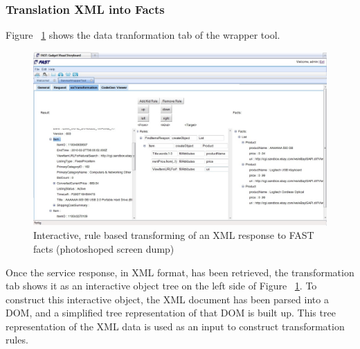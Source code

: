 \documentclass{fast_latex}
\begin{document}
\subsubsection{Translation XML into Facts} %
\label{ssub:translation_xml_into_facts}

Figure ~\ref{fig:response_service_execution} shows the data tranformation tab of the wrapper tool. 

\begin{figure}
  \begin{center}
      \includegraphics[angle=90,width=0.8\linewidth]{images/ServiceWrapperToolGVSWithTransformationRules.jpg}
    \caption{Interactive, rule based transforming of an XML response to FAST facts (photoshoped screen dump)}
    \label{fig:response_service_execution}
  \end{center}
\end{figure}

Once the service response, in XML format, has been retrieved, the transformation tab shows it as an interactive object tree on the left side of Figure ~\ref{fig:response_service_execution}. To construct this interactive object, the XML document has been parsed into a DOM, and a simplified tree representation of that DOM is built up. This tree representation of the XML data is used as an input to construct transformation rules.
\end{document}
